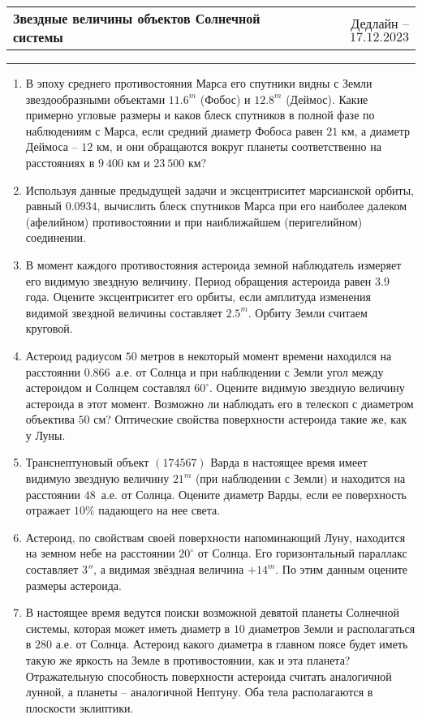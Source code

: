\documentclass[12pt]{article}
\begin{document}
 \begin{tabularx}{\textwidth}{Xr}
  {\Large \textbf{Звездные величины объектов Солнечной системы}} & Дедлайн -- $17.12.2023$ \\
 \end{tabularx}
 \noindent\rule{\textwidth}{0.4pt}
 \begin{enumerate}
        \item В эпоху среднего противостояния Марса его спутники видны с Земли звездообразными объектами $11.6^m$ (Фобос) и $12.8^m$ (Деймос). Какие примерно угловые размеры и каков блеск спутников в полной фазе по наблюдениям с Марса, если средний диаметр Фобоса равен $21$ км, а диаметр Деймоса -- $12$ км, и они обращаются вокруг планеты соответственно на расстояниях в $9~400$ км и $23~500$ км?
        \item Используя данные предыдущей задачи и эксцентриситет марсианской орбиты, равный $0.0934$, вычислить блеск спутников Марса при его наиболее далеком (афелийном) противостоянии и при наиближайшем (перигелийном) соединении.
        \item В момент каждого противостояния астероида земной наблюдатель измеряет его видимую звездную величину. Период обращения астероида равен $3.9$ года. Оцените эксцентриситет его орбиты, если амплитуда изменения видимой звездной величины составляет $2.5^m$. Орбиту Земли считаем круговой.
        \item Астероид радиусом $50$ метров в некоторый момент времени находился на расстоянии $0.866$~а.е. от Солнца и при наблюдении с Земли угол между астероидом и Солнцем составлял $60^{\circ}$. Оцените видимую звездную величину астероида в этот момент. Возможно ли наблюдать его в телескоп с диаметром объектива $50$ см? Оптические свойства поверхности астероида такие же, как у Луны.
        \item Транснептуновый объект $(174567)$ Варда в настоящее время имеет видимую звездную	величину $21^m$ (при наблюдении с Земли) и находится на расстоянии $48$~а.е. от Солнца.	Оцените диаметр Варды, если ее поверхность отражает $10\%$ падающего на нее света.
        \item Астероид, по свойствам своей поверхности напоминающий Луну, находится на земном небе на расстоянии $20^{\circ}$ от Солнца. Его горизонтальный параллакс составляет $3''$, а видимая звёздная величина $+14^m$. По этим данным оцените размеры астероида.
        \item В настоящее время ведутся поиски возможной девятой планеты Солнечной системы, которая может иметь диаметр в $10$ диаметров Земли и располагаться в $280$ а.е. от Солнца. Астероид какого диаметра в главном поясе будет иметь такую же яркость на Земле в противостоянии, как и эта планета? Отражательную способность поверхности астероида считать аналогичной лунной, а планеты – аналогичной Нептуну. Оба тела располагаются в плоскости эклиптики.

\end{enumerate}
\end{document}
